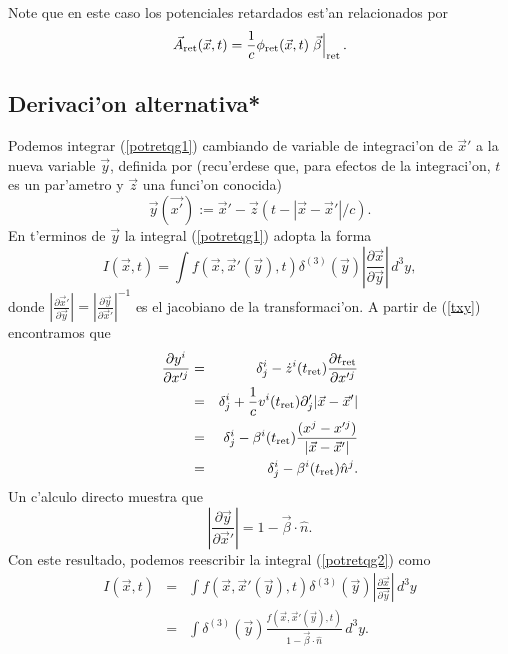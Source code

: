 Note que en este caso los potenciales retardados est'an relacionados por
\begin{equation}
\vec{A}_{\rm ret}(\vec{x},t)=\frac{1}{c}\phi_{\rm ret}(\vec{x},t)\left.\vec{\beta}\right|_{\rm ret}.
\end{equation}


\subsection{Derivaci'on alternativa*}
Podemos integrar (\ref{potretqg1}) cambiando de variable de integraci'on de $\vec{x}'$ a la nueva variable $\vec{y}$, definida por (recu'erdese que, para efectos de la integraci'on, $t$ es un par'ametro y $\vec{z}$ una funci'on conocida)
\begin{equation}
 \vec{y}(\vec{x'}):=\vec{x}'-\vec{z}(t-|\vec{x}-\vec{x}'|/c). \label{txy}
\end{equation}
En t'erminos de $\vec{y}$ la integral (\ref{potretqg1}) adopta la forma
\begin{equation}
I(\vec{x},t)=\int f(\vec{x},\vec{x}'(\vec{y}),t)\delta^{(3)}(\vec{y})
\left|\frac{\partial \vec{x}}{\partial \vec{y}}\right|\,d^3y, \label{potretqg2}
\end{equation}
donde $\left|\frac{\partial \vec{x}'}{\partial \vec{y}}\right|=\left|\frac{\partial \vec{y}}{\partial \vec{x}'}\right|^{-1}$ es el jacobiano de la transformaci'on. A partir de (\ref{txy}) encontramos que
\begin{eqnarray}
\frac{\partial y^i}{\partial x'^j}&=&\delta^i_j-\dot{z}^i(t_{\rm ret})\frac{\partial t_{\rm ret}}{\partial x'^j} \\
&=&\delta^i_j+\frac{1}{c}v^i(t_{\rm ret})\partial'_j|\vec{x}-\vec{x}'|\\
&=&\delta^i_j-\beta^i(t_{\rm ret})\frac{(x^j-x'^j)}{|\vec{x}-\vec{x}'|}\\
&=&\delta^i_j-\beta^i(t_{\rm ret})\hat{n}^j.
\end{eqnarray}
Un c'alculo directo muestra que
\begin{equation}
 \left|\frac{\partial \vec{y}}{\partial \vec{x}'}\right|=1-\vec\beta\cdot\hat{n}.
\end{equation}
Con este resultado, podemos reescribir la integral (\ref{potretqg2}) como
\begin{eqnarray}
I(\vec{x},t)&=&\int f(\vec{x},\vec{x}'(\vec{y}),t)\delta^{(3)}(\vec{y})
\left|\frac{\partial \vec{x}}{\partial \vec{y}}\right|\,d^3y \\
&=&\int \delta^{(3)}(\vec{y})
\frac{f(\vec{x},\vec{x}'(\vec{y}),t)}{1-\vec\beta\cdot\hat{n} }\,d^3y . \label{potretqg3}
\end{eqnarray}
